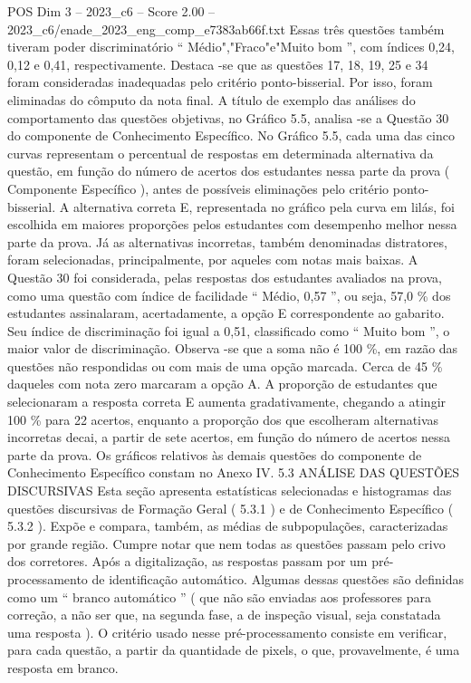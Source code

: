 \begin{textsample}{POS Dim 3 – 2023\_c6 – Score 2.00 – 2023\_c6/enade\_2023\_eng\_comp\_e7383ab66f.txt}
Essas três questões também tiveram poder discriminatório “ Médio","Fraco"e"Muito bom ”, com índices 0,24, 0,12 e 0,41, respectivamente.
Destaca -se que as questões 17, 18, 19, 25 e 34 foram consideradas inadequadas pelo critério ponto-bisserial.
Por isso, foram eliminadas do cômputo da nota final.
A título de exemplo das análises do comportamento das questões objetivas, no Gráfico 5.5, analisa -se a Questão 30 do componente de Conhecimento Específico.
No Gráfico 5.5, cada uma das cinco curvas representam o percentual de respostas em determinada alternativa da questão, em função do número de acertos dos estudantes nessa parte da prova ( Componente Específico ), antes de possíveis eliminações pelo critério ponto-bisserial.
A alternativa correta E, representada no gráfico pela curva em lilás, foi escolhida em maiores proporções pelos estudantes com desempenho melhor nessa parte da prova.
Já as alternativas incorretas, também denominadas distratores, foram selecionadas, principalmente, por aqueles com notas mais baixas.
A Questão 30 foi considerada, pelas respostas dos estudantes avaliados na prova, como uma questão com índice de facilidade “ Médio, 0,57 ”, ou seja, 57,0 \% dos estudantes assinalaram, acertadamente, a opção E correspondente ao gabarito.
Seu índice de discriminação foi igual a 0,51, classificado como “ Muito bom ”, o maior valor de discriminação.
Observa -se que a soma não é 100 \%, em razão das questões não respondidas ou com mais de uma opção marcada.
Cerca de 45 \% daqueles com nota zero marcaram a opção A.
A proporção de estudantes que selecionaram a resposta correta E aumenta gradativamente, chegando a atingir 100 \% para 22 acertos, enquanto a proporção dos que escolheram alternativas incorretas decai, a partir de sete acertos, em função do número de acertos nessa parte da prova.
Os gráficos relativos às demais questões do componente de Conhecimento Específico constam no Anexo IV. 5.3 ANÁLISE DAS QUESTÕES DISCURSIVAS Esta seção apresenta estatísticas selecionadas e histogramas das questões discursivas de Formação Geral ( 5.3.1 ) e de Conhecimento Específico ( 5.3.2 ).
Expõe e compara, também, as médias de subpopulações, caracterizadas por grande região.
Cumpre notar que nem todas as questões passam pelo crivo dos corretores.
Após a digitalização, as respostas passam por um pré-processamento de identificação automático.
Algumas dessas questões são definidas como um “ branco automático ” ( que não são enviadas aos professores para correção, a não ser que, na segunda fase, a de inspeção visual, seja constatada uma resposta ).
O critério usado nesse pré-processamento consiste em verificar, para cada questão, a partir da quantidade de pixels, o que, provavelmente, é uma resposta em branco.

\end{textsample}
